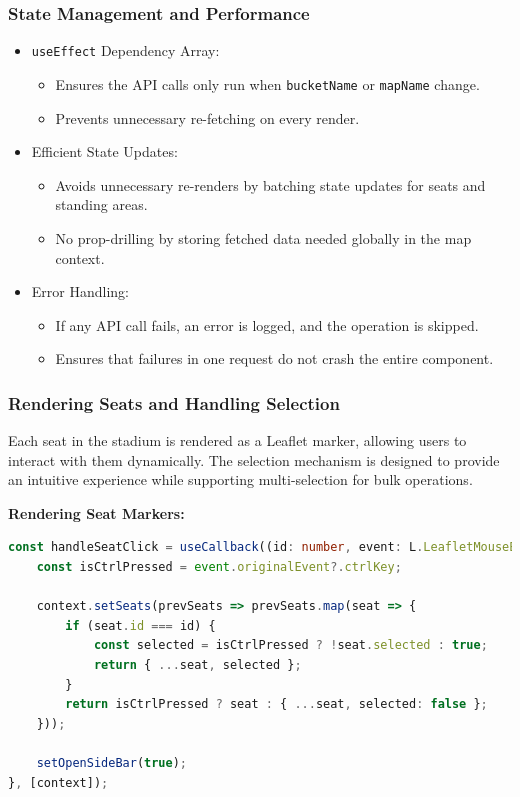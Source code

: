 \subsubsection{State Management and Performance}
\begin{itemize}
    \item \texttt{useEffect} Dependency Array:
    \begin{itemize}
        \item Ensures the API calls only run when \texttt{bucketName} or \texttt{mapName} change.
        \item Prevents unnecessary re-fetching on every render.
    \end{itemize}
    
    \item Efficient State Updates:
    \begin{itemize}
        \item Avoids unnecessary re-renders by batching state updates for seats and standing areas.
        \item No prop-drilling by storing fetched data needed globally in the map context.
    \end{itemize}

    \item Error Handling:
    \begin{itemize}
        \item If any API call fails, an error is logged, and the operation is skipped.
        \item Ensures that failures in one request do not crash the entire component.
    \end{itemize}
\end{itemize}

\subsubsection{Rendering Seats and Handling Selection}

Each seat in the stadium is rendered as a Leaflet marker, allowing users to interact with them dynamically. The selection mechanism is designed to provide an intuitive experience while supporting multi-selection for bulk operations.

\textbf{Rendering Seat Markers:}
\begin{lstlisting}[language=TypeScript, caption=Rendering and Selecting Seats, label=lst:seat-rendering]
const handleSeatClick = useCallback((id: number, event: L.LeafletMouseEvent) => {
    const isCtrlPressed = event.originalEvent?.ctrlKey;

    context.setSeats(prevSeats => prevSeats.map(seat => {
        if (seat.id === id) {
            const selected = isCtrlPressed ? !seat.selected : true;
            return { ...seat, selected };
        }
        return isCtrlPressed ? seat : { ...seat, selected: false };
    }));

    setOpenSideBar(true);
}, [context]);
\end{lstlisting}

